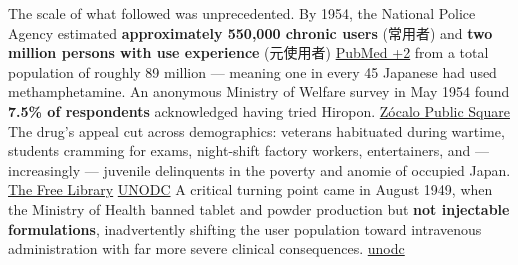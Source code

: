 The scale of what followed was unprecedented. By 1954, the National Police Agency estimated \textbf{approximately 550,000 chronic users} (常用者) and \textbf{two million persons with use experience} (元使用者) \href{https://pubmed.ncbi.nlm.nih.gov/2765722/}{PubMed +2} from a total population of roughly 89 million --- meaning one in every 45 Japanese had used methamphetamine. An anonymous Ministry of Welfare survey in May 1954 found \textbf{7.5\% of respondents} acknowledged having tried Hiropon. \href{https://www.zocalopublicsquare.org/the-world-war-ii-wonder-drug-that-never-left-japan/}{Zócalo Public Square} The drug's appeal cut across demographics: veterans habituated during wartime, students cramming for exams, night-shift factory workers, entertainers, and --- increasingly --- juvenile delinquents in the poverty and anomie of occupied Japan. \href{https://www.thefreelibrary.com/Methamphetamine+use+in+Japan+after+the+Second+World+War:...-a0210368292}{The Free Library} \href{https://www.unodc.org/unodc/en/data-and-analysis/bulletin/bulletin_1989-01-01_1_page007.html}{UNODC} A critical turning point came in August 1949, when the Ministry of Health banned tablet and powder production but \textbf{not injectable formulations}, inadvertently shifting the user population toward intravenous administration with far more severe clinical consequences. \href{https://www.unodc.org/unodc/en/data-and-analysis/bulletin/bulletin_1989-01-01_1_page007.html}{unodc}


